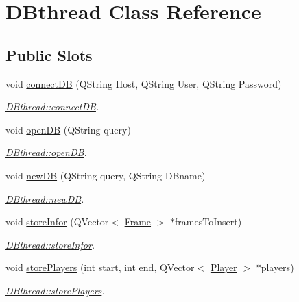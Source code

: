 \hypertarget{classDBthread}{\section{D\-Bthread Class Reference}
\label{classDBthread}
}
\subsection*{Public Slots}
\begin{DoxyCompactItemize}
\item 
void \hyperlink{classDBthread_a2dbcf7890c95b1fca26f9bd21d054e46}{connect\-D\-B} (Q\-String Host, Q\-String User, Q\-String Password)
\begin{DoxyCompactList}\small\item\em \hyperlink{classDBthread_a2dbcf7890c95b1fca26f9bd21d054e46}{D\-Bthread\-::connect\-D\-B}. \end{DoxyCompactList}\item 
void \hyperlink{classDBthread_a355e688d4a6f590578f2c29f468b3ad0}{open\-D\-B} (Q\-String query)
\begin{DoxyCompactList}\small\item\em \hyperlink{classDBthread_a355e688d4a6f590578f2c29f468b3ad0}{D\-Bthread\-::open\-D\-B}. \end{DoxyCompactList}\item 
void \hyperlink{classDBthread_a86757b487ce90e3589334d6f96dc6684}{new\-D\-B} (Q\-String query, Q\-String D\-Bname)
\begin{DoxyCompactList}\small\item\em \hyperlink{classDBthread_a86757b487ce90e3589334d6f96dc6684}{D\-Bthread\-::new\-D\-B}. \end{DoxyCompactList}\item 
void \hyperlink{classDBthread_ad5e320be8718aa773eeab3303ceb9d07}{store\-Infor} (Q\-Vector$<$ \hyperlink{structFrame}{Frame} $>$ $\ast$frames\-To\-Insert)
\begin{DoxyCompactList}\small\item\em \hyperlink{classDBthread_ad5e320be8718aa773eeab3303ceb9d07}{D\-Bthread\-::store\-Infor}. \end{DoxyCompactList}\item 
void \hyperlink{classDBthread_a37468e05639656f8a6d9f69a3937676e}{store\-Players} (int start, int end, Q\-Vector$<$ \hyperlink{classPlayer}{Player} $>$ $\ast$players)
\begin{DoxyCompactList}\small\item\em \hyperlink{classDBthread_a37468e05639656f8a6d9f69a3937676e}{D\-Bthread\-::store\-Players}. \end{DoxyCompactList}\end{DoxyCompactItemize}
